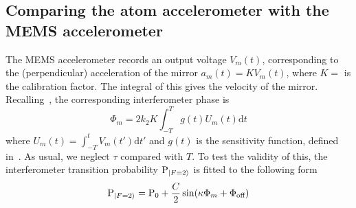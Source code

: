 \subsection{Comparing the atom accelerometer with the MEMS
accelerometer}\label{subsec:vibration_sensitivity}
The MEMS accelerometer records an output voltage $V_m (t)$,
corresponding to the (perpendicular) acceleration of the mirror $a_m
(t) = K V_m(t)$, where $K =$  is
the calibration factor. The integral of this gives the
velocity of the mirror. Recalling~, the
corresponding interferometer phase is
\begin{equation}
  \Phi_m =  2k_2 K\int_{-T}^{T} g(t) U_m(t)
  \mathrm{d}t
  \label{eq:phase_vib}
\end{equation}
where \(U_m(t) = \int_{-T}^{t} V_m(t') \mathrm{d}t'\) 
and \(g(t)\) is 
the sensitivity function, defined
in~. As usual, we neglect
$\tau$ compared with $T$. 
To test the validity of this, the interferometer transition
probability $\text{P}_{\ket{F=2}}$ is fitted to the following form
\begin{equation}
  \text{P}_{\ket{F=2}} = \text{P}_0 + \frac{C}{2}\sin(\kappa
  \Phi_m + \Phi_\text{off})
  \label{eq:fringe_fit_vibration}
\end{equation}
